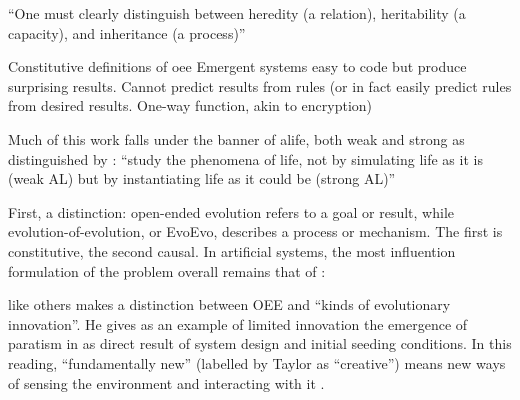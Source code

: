 \begin{NOTES}
	
	``One must clearly distinguish between heredity (a relation), heritability (a capacity), and inheritance (a process)'' \autocite{Griesemer2005}
	
Constitutive definitions of \gls{oee}
Emergent systems easy to code but produce surprising results. Cannot predict results from rules (or in fact easily predict rules from desired results. One-way function, akin to encryption) \parencite{Nellis2014}

Much of this work falls under the banner of \gls{alife}, both weak and strong as distinguished by \cite{Langton1989}: ``study the phenomena of life, not by simulating life as it is (weak AL) but by instantiating life as it could be (strong AL)''

First, a distinction: open-ended evolution refers to a goal or result, while evolution-of-evolution, or EvoEvo, describes a process or mechanism. The first is constitutive, the second causal. In artificial systems, the most influention formulation of the problem overall remains that of \cite{Bedau:2000mi}:


\parencite{Taylor2001} like others makes a distinction between OEE and ``kinds of evolutionary innovation''. He gives as an example of limited innovation the emergence of paratism in \cite{Ray1991} as direct result of system design and initial seeding conditions. In this reading, ``fundamentally new'' (labelled by Taylor as ``creative'') means new ways of sensing the environment and interacting with it \cite{Taylor2001}.



\end{NOTES}
